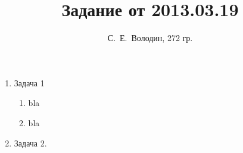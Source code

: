\documentclass{article}
\title{Задание от 2013.03.19}
\author{С.~Е.~Володин, 272 гр.}
\date{}
\begin{document}
\maketitle
\begin{enumerate} 
\item Задача 1
\begin{enumerate}
\item bla
\item bla
\end{enumerate}
\item Задача 2.
\end{enumerate}
\end{document}
